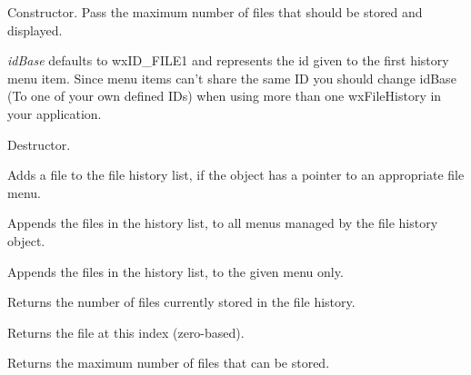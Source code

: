 Constructor. Pass the maximum number of files that should be stored and
displayed.

{\it idBase} defaults to wxID\_FILE1 and represents the id given to the first
history menu item.  Since menu items can't share the same ID you should change
idBase (To one of your own defined IDs) when using more than one wxFileHistory
in your application.


\label{wxfilehistorydtor}


Destructor.


\label{wxfilehistoryaddfiletohistory}


Adds a file to the file history list, if the object has a pointer to an appropriate file menu.


\label{wxfilehistoryaddfilestomenu}

\label{wxfilehistoryaddfilestomenu}

Appends the files in the history list, to all menus managed by the file history object.


Appends the files in the history list, to the given menu only.


\label{wxfilehistorygetcount}


Returns the number of files currently stored in the file history.


\label{wxfilehistorygethistoryfile}


Returns the file at this index (zero-based).


\label{wxfilehistorygetmaxfiles}


Returns the maximum number of files that can be stored.


\label{wxfilehistorygetmenus}

